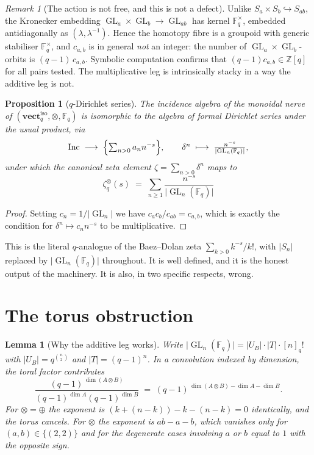 \documentclass[11pt,a4paper]{article}
\newtheorem{proposition}[theorem]{Proposition}
\newtheorem{lemma}[theorem]{Lemma}
\theoremstyle{definition}
\theoremstyle{remark}
\newtheorem{remark}[theorem]{Remark}
\newcommand{\FF}{\mathbb{F}}
\newcommand{\ZZ}{\mathbb{Z}}
\newcommand{\cat}[1]{\mathbf{#1}}
\newcommand{\vect}{\cat{vect}}
\DeclareMathOperator{\GL}{GL}
\DeclareMathOperator{\Inc}{Inc}
\newcommand{\norm}[1]{\lvert #1 \rvert}
\newcommand{\iso}{\mathrm{iso}}
\begin{document}
\begin{remark}[The action is not free, and this is not a defect]
Unlike $S_a \times S_b \hookrightarrow S_{ab}$, the Kronecker embedding $\GL_a \times
\GL_b \to \GL_{ab}$ has kernel $\FF_q^\times$, embedded antidiagonally as $(\lambda,
\lambda^{-1})$. Hence the homotopy fibre is a groupoid with generic stabiliser
$\FF_q^\times$, and $c_{a,b}$ is in general \emph{not} an integer: the number of
$\GL_a\times\GL_b$-orbits is $(q-1)\,c_{a,b}$. Symbolic computation confirms that
$(q-1)c_{a,b} \in \ZZ[q]$ for all pairs tested. The multiplicative leg is intrinsically
stacky in a way the additive leg is not.
\end{remark}

\begin{proposition}[$q$-Dirichlet series]\label{prop:qdir}
The incidence algebra of the monoidal nerve of $(\vect_q^{\iso},\otimes,\FF_q)$ is
isomorphic to the algebra of formal Dirichlet series under the usual product, via
\[
  \Inc \;\longrightarrow\; \Bigl\{\textstyle\sum_{n>0} a_n n^{-s}\Bigr\},
  \qquad
  \delta^n \;\longmapsto\; \frac{n^{-s}}{\norm{\GL_n(\FF_q)}},
\]
under which the canonical zeta element $\zeta = \sum_{n>0}\delta^n$ maps to
\[
  \boxed{\;\zeta_q^{\otimes}(s) \;=\; \sum_{n \ge 1} \frac{n^{-s}}{\norm{\GL_n(\FF_q)}}\;}
\]
\end{proposition}

\begin{proof}
Setting $c_n = 1/\norm{\GL_n}$ we have $c_a c_b/c_{ab} = c_{a,b}$, which is exactly the
condition for $\delta^n \mapsto c_n n^{-s}$ to be multiplicative.
\end{proof}

This is the literal $q$-analogue of the Baez--Dolan zeta $\sum_{k>0} k^{-s}/k!$, with
$\norm{S_n}$ replaced by $\norm{\GL_n(\FF_q)}$ throughout. It is well defined, and it is
the honest output of the machinery. It is also, in two specific respects, wrong.

\section{The torus obstruction}\label{sec:torus}

\begin{lemma}[Why the additive leg works]\label{lem:cancel}
Write $\norm{\GL_n(\FF_q)} = \norm{U_B}\cdot\norm{T}\cdot[n]_q!$ with $\norm{U_B} =
q^{\binom n 2}$ and $\norm{T} = (q-1)^n$. In a convolution indexed by dimension, the toral
factor contributes
\[
  \frac{(q-1)^{\,\dim(A\otimes B)}}{(q-1)^{\dim A}(q-1)^{\dim B}}
  \;=\;
  (q-1)^{\,\dim(A\otimes B) - \dim A - \dim B}.
\]
For $\otimes = \oplus$ the exponent is $ (k + (n-k)) - k - (n-k) = 0$ identically, and the
torus cancels. For $\otimes$ the exponent is $ab - a - b$, which vanishes only for $(a,b)
\in \{(2,2)\}$ and for the degenerate cases involving $a$ or $b$ equal to $1$ with the
opposite sign.
\end{lemma}
\end{document}

